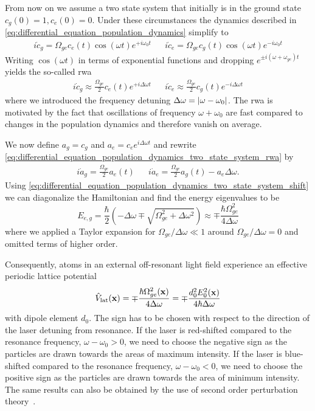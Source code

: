 From now on we assume a two state system that initially is in the ground
state $c_g(0)=1,c_e(0)=0$. Under these circumstances the dynamics described in
\cref{eq:differential_equation_population_dynamics} simplify to
\begin{align}
  i\dot{c}_g=\Omega_{ge}c_e(t)\cos(\omega t)e^{+i\omega_0 t} &&
  i\dot{c}_e=\Omega_{ge}c_g(t)\cos(\omega t)e^{-i\omega_0 t}
  \label{eq:differential_equation_population_dynamics_two_state_system}
\end{align}
Writing $\cos(\omega t)$ in terms of exponential functions and dropping
$e^{\pm i(\omega+\omega_{ge})t}$ yields the so-called \gls{rwa}
\begin{align}
  i\dot{c}_g\approx\frac{\Omega_{ge}}{2}c_e(t)e^{+i\Delta\omega t} &&
  i\dot{c}_e\approx\frac{\Omega_{ge}}{2}c_g(t)e^{-i\Delta\omega t}
  \label{eq:differential_equation_population_dynamics_two_state_system_rwa}
\end{align}
where we introduced the frequency detuning
$\Delta\omega=\abs{\omega-\omega_0}$. The \gls{rwa} is motivated by the fact
that oscillations of frequency $\omega+\omega_0$ are fast compared to changes
in the population dynamics and therefore vanish on average.

We now define $a_g=c_g$ and $a_e=c_e e^{i\Delta\omega t}$ and rewrite
\cref{eq:differential_equation_population_dynamics_two_state_system_rwa} by
\begin{align}
  i\dot{a}_g=\frac{\Omega_{ge}}{2}a_e(t) &&
  i\dot{a}_e=\frac{\Omega_{ge}}{2}a_g(t)-a_e\Delta\omega
  \label{eq:differential_equation_population_dynamics_two_state_system_shift}.
\end{align}
Using
\cref{eq:differential_equation_population_dynamics_two_state_system_shift} we
can diagonalize the Hamiltonian and find the energy eigenvalues to be
\begin{equation}
  E_{e,g}
  =\frac{\hbar}{2}\left(-\Delta\omega\mp\sqrt{\Omega_{ge}^2+\Delta\omega^2}\right)
  \approx
  \mp\frac{\hbar\Omega_{ge}^2}{4\Delta\omega}
  \label{eq:eigenvalues_energy_light_shift}
\end{equation}
where we applied a Taylor expansion for $\Omega_{ge}/\Delta\omega\ll1$ around
$\Omega_{ge}/\Delta\omega=0$ and omitted terms of higher order.

Consequently, atoms in an external off-resonant light field experience an
effective periodic lattice potential
\begin{equation}
  \hat{V}_\text{lat}(\vb{x})
  =
  \mp\frac{\hbar\Omega_{ge}^2(\vb{x})}{4\Delta\omega}
  =
  \mp\frac{d_0^2E_0^2(\vb{x})}{4\hbar\Delta\omega}
  \label{eq:potential_lattice}
\end{equation}
with dipole element $d_0$. The sign has to be chosen with respect to the
direction of the laser detuning from resonance. If the laser is red-shifted
compared to the resonance frequency, $\omega-\omega_0>0$, we need to choose
the negative sign as the particles are drawn towards the areas of maximum
intensity. If the laser is blue-shifted compared to the resonance frequency,
$\omega-\omega_0<0$, we need to choose the positive sign as the particles are
drawn towards the area of minimum intensity. The same results can also be
obtained by the use of second order perturbation theory~\cite{Grimm2008}.

